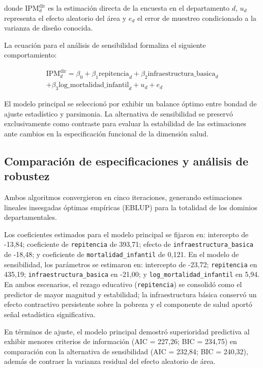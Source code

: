 donde $\text{IPM}_d^{\text{dir}}$ es la estimación directa de la encuesta en el departamento $d$, $u_d$ representa el efecto aleatorio del área y $e_d$ el error de muestreo condicionado a la varianza de diseño conocida.

La ecuación para el análisis de sensibilidad formaliza el siguiente comportamiento:

\begin{equation}
    \begin{split}        
        \text{IPM}_d^{\text{dir}} = \beta_0 + \beta_1 \text{repitencia}_d + \beta_2  \text{infraestructura\_basica}_d  \\ + \beta_3 \text{log\_mortalidad\_infantil}_d + u_d + e_d
    \end{split}
\end{equation}

El modelo principal se seleccionó por exhibir un balance óptimo entre bondad de ajuste estadístico y parsimonia. La alternativa de sensibilidad se preservó exclusivamente como contraste para evaluar la estabilidad de las estimaciones ante cambios en la especificación funcional de la dimensión salud.

\subsection{Comparación de especificaciones y análisis de robustez}
Ambos algoritmos convergieron en cinco iteraciones, generando estimaciones lineales insesgadas óptimas empíricas (EBLUP) para la totalidad de los dominios departamentales. 

Los coeficientes estimados para el modelo principal se fijaron en: intercepto de -13,84; coeficiente de \texttt{repitencia} de 393,71; efecto de \texttt{infraestructura\_basica} de -18,48; y coeficiente de \texttt{mortalidad\_infantil} de 0,121. En el modelo de sensibilidad, los parámetros se estimaron en: intercepto de -23,72; \texttt{repitencia} en 435,19; \texttt{infraestructura\_basica} en -21,00; y \texttt{log\_mortalidad\_infantil} en 5,94. En ambos escenarios, el rezago educativo (\texttt{repitencia}) se consolidó como el predictor de mayor magnitud y estabilidad; la infraestructura básica conservó un efecto contractivo persistente sobre la pobreza y el componente de salud aportó señal estadística significativa.

En términos de ajuste, el modelo principal demostró superioridad predictiva al exhibir menores criterios de información (AIC = 227,26; BIC = 234,75) en comparación con la alternativa de sensibilidad (AIC = 232,84; BIC = 240,32), además de contraer la varianza residual del efecto aleatorio de área. 

